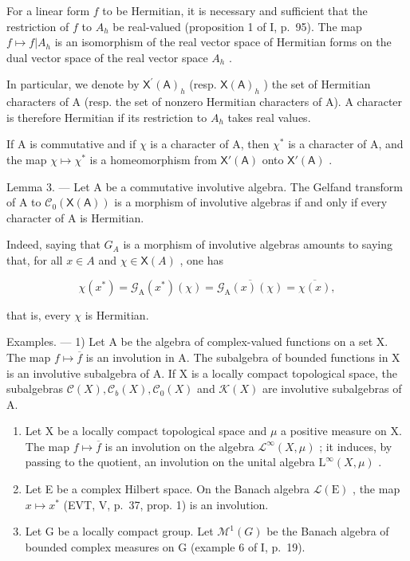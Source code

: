 For a linear form \(f\) to be Hermitian, it is necessary and sufficient that the restriction of \(f\) to \(A_h\) be real-valued (proposition 1 of I, p.~95). The map \(f \mapsto f|A_h\) is an isomorphism of the real vector space of Hermitian forms on the dual vector space of the real vector space \(A_h\) .

In particular, we denote by \(\mathsf{X}^{\prime}(\mathsf{A})_{h}\) (resp. \(\mathsf{X}(\mathsf{A})_{h}\) ) the set of Hermitian characters of A (resp. the set of nonzero Hermitian characters of A). A character is therefore Hermitian if its restriction to \(A_{h}\) takes real values.

If A is commutative and if \(\chi\) is a character of A, then \(\chi^{*}\) is a character of A, and the map \(\chi \mapsto \chi^{*}\) is a homeomorphism from \(\mathsf{X}'(\mathsf{A})\) onto \(\mathsf{X}'(\mathsf{A})\) .

Lemma 3. --- Let A be a commutative involutive algebra. The Gelfand transform of A to \(\mathcal{C}_{0}(\mathsf{X}(\mathsf{A}))\) is a morphism of involutive algebras if and only if every character of A is Hermitian.

Indeed, saying that \(G_{A}\) is a morphism of involutive algebras amounts to saying that, for all \(x \in A\) and \(\chi \in \mathsf{X}(A)\) , one has

\[
\chi (x ^ {*}) = \mathcal {G} _ {\mathrm{A}} (x ^ {*}) (\chi) = \overline {{\mathcal {G} _ {\mathrm{A}} (x) (\chi)}} = \overline {{\chi (x)}},
\]

that is, every \(\chi\) is Hermitian.

Examples. --- 1) Let A be the algebra of complex-valued functions on a set X. The map \(f \mapsto \overline{f}\) is an involution in A. The subalgebra of bounded functions in X is an involutive subalgebra of A. If X is a locally compact topological space, the subalgebras \(\mathcal{C}(X), \mathcal{C}_b(X), \mathcal{C}_0(X)\) and \(\mathcal{K}(X)\) are involutive subalgebras of A.

\begin{enumerate}
\def\labelenumi{\arabic{enumi})}
\setcounter{enumi}{1}
\item
  Let X be a locally compact topological space and \(\mu\) a positive measure on X. The map \(f \mapsto \overline{f}\) is an involution on the algebra \(\mathcal{L}^{\infty}(X, \mu)\) ; it induces, by passing to the quotient, an involution on the unital algebra \(\mathrm{L}^{\infty}(X, \mu)\) .
\item
  Let E be a complex Hilbert space. On the Banach algebra \(\mathcal{L}(\mathrm{E})\) , the map \(x \mapsto x^{*}\) (EVT, V, p.~37, prop. 1) is an involution.
\item
  Let G be a locally compact group. Let \(\mathcal{M}^{1}(G)\) be the Banach algebra of bounded complex measures on G (example 6 of I, p.~19).
\end{enumerate}

